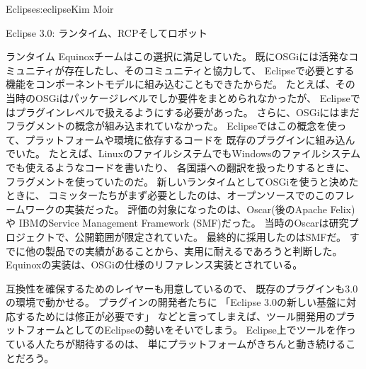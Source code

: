 \begin{aosachapter}{Eclipse}{s:eclipse}{Kim Moir}
\begin{aosasect1}{Eclipse 3.0: ランタイム、RCPそしてロボット}
\begin{aosasect2}{ランタイム}
Equinoxチームはこの選択に満足していた。
既にOSGiには活発なコミュニティが存在したし、そのコミュニティと協力して、
Eclipseで必要とする機能をコンポーネントモデルに組み込むこともできたからだ。
たとえば、その当時のOSGiはパッケージレベルでしか要件をまとめられなかったが、
Eclipseではプラグインレベルで扱えるようにする必要があった。
さらに、OSGiにはまだフラグメントの概念が組み込まれていなかった。
Eclipseではこの概念を使って、プラットフォームや環境に依存するコードを
既存のプラグインに組み込んでいた。
たとえば、LinuxのファイルシステムでもWindowsのファイルシステムでも使えるようなコードを書いたり、
各国語への翻訳を扱ったりするときに、フラグメントを使っていたのだ。
新しいランタイムとしてOSGiを使うと決めたときに、
コミッターたちがまず必要としたのは、オープンソースでのこのフレームワークの実装だった。
評価の対象になったのは、Oscar(後のApache Felix)や
IBMのService Management Framework (SMF)だった。
当時のOscarは研究プロジェクトで、公開範囲が限定されていた。
最終的に採用したのはSMFだ。
すでに他の製品での実績があることから、実用に耐えるであろうと判断した。
Equinoxの実装は、OSGiの仕様のリファレンス実装とされている。

互換性を確保するためのレイヤーも用意しているので、
既存のプラグインも3.0の環境で動かせる。
プラグインの開発者たちに
「Eclipse 3.0の新しい基盤に対応するためには修正が必要です」
などと言ってしまえば、ツール開発用のプラットフォームとしてのEclipseの勢いをそいでしまう。
Eclipse上でツールを作っている人たちが期待するのは、
単にプラットフォームがきちんと動き続けることだろう。


\end{aosasect2}
\end{aosasect1}
\end{aosachapter}
